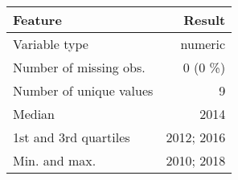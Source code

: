 \documentclass[]{article}
\begin{document}
\begin{longtable}[]{@{}lr@{}}
\toprule
\begin{minipage}[b]{0.34\columnwidth}\raggedright\strut
Feature\strut
\end{minipage} & \begin{minipage}[b]{0.16\columnwidth}\raggedleft\strut
Result\strut
\end{minipage}\tabularnewline
\midrule
\endhead
\begin{minipage}[t]{0.34\columnwidth}\raggedright\strut
Variable type\strut
\end{minipage} & \begin{minipage}[t]{0.16\columnwidth}\raggedleft\strut
numeric\strut
\end{minipage}\tabularnewline
\begin{minipage}[t]{0.34\columnwidth}\raggedright\strut
Number of missing obs.\strut
\end{minipage} & \begin{minipage}[t]{0.16\columnwidth}\raggedleft\strut
0 (0 \%)\strut
\end{minipage}\tabularnewline
\begin{minipage}[t]{0.34\columnwidth}\raggedright\strut
Number of unique values\strut
\end{minipage} & \begin{minipage}[t]{0.16\columnwidth}\raggedleft\strut
9\strut
\end{minipage}\tabularnewline
\begin{minipage}[t]{0.34\columnwidth}\raggedright\strut
Median\strut
\end{minipage} & \begin{minipage}[t]{0.16\columnwidth}\raggedleft\strut
2014\strut
\end{minipage}\tabularnewline
\begin{minipage}[t]{0.34\columnwidth}\raggedright\strut
1st and 3rd quartiles\strut
\end{minipage} & \begin{minipage}[t]{0.16\columnwidth}\raggedleft\strut
2012; 2016\strut
\end{minipage}\tabularnewline
\begin{minipage}[t]{0.34\columnwidth}\raggedright\strut
Min. and max.\strut
\end{minipage} & \begin{minipage}[t]{0.16\columnwidth}\raggedleft\strut
2010; 2018\strut
\end{minipage}\tabularnewline
\bottomrule
\end{longtable}
\end{document}
